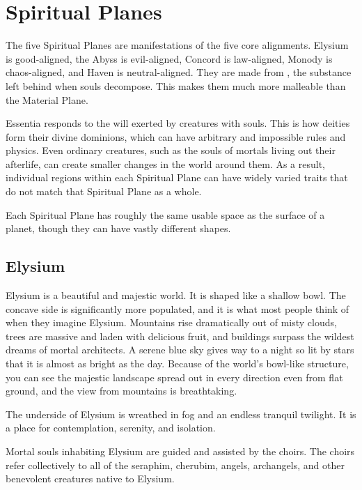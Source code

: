 \section{Spiritual Planes}
    The five Spiritual Planes are manifestations of the five core alignments.
    Elysium is good-aligned, the Abyss is evil-aligned, Concord is law-aligned, Monody is chaos-aligned, and Haven is neutral-aligned.
    They are made from , the substance left behind when souls decompose.
    This makes them much more malleable than the Material Plane.

    Essentia responds to the will exerted by creatures with souls.
    This is how deities form their divine dominions, which can have arbitrary and impossible rules and physics.
    Even ordinary creatures, such as the souls of mortals living out their afterlife, can create smaller changes in the world around them.
    As a result, individual regions within each Spiritual Plane can have widely varied traits that do not match that Spiritual Plane as a whole.

    Each Spiritual Plane has roughly the same usable space as the surface of a planet, though they can have vastly different shapes.

    \subsection{Elysium}
      Elysium is a beautiful and majestic world.
      It is shaped like a shallow bowl.
      The concave side is significantly more populated, and it is what most people think of when they imagine Elysium.
      Mountains rise dramatically out of misty clouds, trees are massive and laden with delicious fruit, and buildings surpass the wildest dreams of mortal architects.
      A serene blue sky gives way to a night so lit by stars that it is almost as bright as the day.
      Because of the world's bowl-like structure, you can see the majestic landscape spread out in every direction even from flat ground, and the view from mountains is breathtaking.

      The underside of Elysium is wreathed in fog and an endless tranquil twilight.
      It is a place for contemplation, serenity, and isolation.

      Mortal souls inhabiting Elysium are guided and assisted by the choirs.
      The choirs refer collectively to all of the seraphim, cherubim, angels, archangels, and other benevolent creatures native to Elysium.


